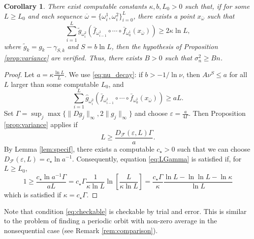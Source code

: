 \documentclass{amsart}
\numberwithin{equation}{section}
\newtheorem{cor}[thm]{Corollary}
\newcommand\cF{{\mathcal F}}
\newcommand\ve{\varepsilon}
\begin{document}
\begin{cor}\label{cor:verify} There exist computable constants $\kappa, b, L_0>0$ such that, if for some $L\geq L_0$ and each sequence $\overline\omega=\{\omega^1_i,\omega^2_i\}_{i=0}^{L}$, there exists a point $x_{\overline\omega}$ such that 
\begin{equation}\label{eq:checkable}
\sum_{i=1}^{L} \tilde g_{\omega^2_i}(\bar f_{\omega^1_{i-1}}\circ \cdots\circ\bar f_{\omega^1_0}(x_{\overline\omega})) \geq 2\kappa \ln L,
\end{equation}
where $\tilde g_k=g_k-\gamma_{S,k}$ and $S=b\ln L$, then the hypothesis of Proposition \ref{prop:variance} are verified. Thus, there exists $B>0$ such that $\sigma_n^2\geq Bn$.
\end{cor} 
\begin{proof}
Let $a=\kappa \frac{\ln L}L$. We use \eqref{eq:nu_decay}: if  $b > -1/\ln \nu$,  then $A\nu^S\leq a$ for all $L$ larger than some computable  $L_0$, and
\[
\sum_{i=1}^{L} \hat g_{\omega^2_i}(\bar f_{\omega^1_{i-1}}\circ \cdots\circ\bar f_{\omega^1_0}(x_{\overline\omega}))\geq a L.
\]
Set $\Gamma=\sup_j\max\{\|D g_j\|_\infty, 2\|g_j\|_\infty\}$ and choose $\ve=\frac{a}{4\Gamma}$. Then Proposition \ref{prop:variance} applies if
\begin{equation}\label{eq:LGamma}
L\geq \frac {D_{\cF}(\ve,L)\Gamma}a.
\end{equation}
By Lemma \ref{lem:specif}, there exists a computable $c_\star>0$ such that  we can choose $D_{\cF}(\ve,L)=c_\star\ln a^{-1}$. Consequently, equation \eqref{eq:LGamma} is satisfied if, for $L\geq L_0$,
\[
1\geq  \frac{c_\star\ln a^{-1}\Gamma}{a L}=c_\star\Gamma \frac 1{\kappa \ln L}\ln\left[\frac L{\kappa\ln L}\right]=\frac{c_\star\Gamma}{\kappa} \frac {\ln L-\ln\ln L-\ln\kappa}{\ln L}
\]
which is satisfied if $\kappa= c_\star\Gamma$. 
\end{proof}

Note that condition \eqref{eq:checkable} is checkable by trial and error. This is similar to the problem of finding a periodic orbit with non-zero average in the nonsequential case (see Remark \ref{rem:comparison}).
\end{document}
